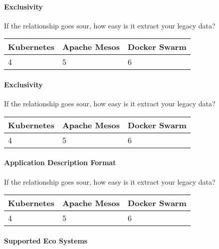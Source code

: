 \paragraph{Exclusivity}

If the relationship goes sour, how easy is it extract your legacy data?

\begin{center}
  \begin{tabular}{ | p{4.2cm} | p{4.2cm} | p{4.2cm} | }
    \hline
    \textbf{Kubernetes}&\textbf{Apache Mesos}&\textbf{Docker Swarm}\\\hline
    4 & 5 & 6 \\
    \hline
  \end{tabular}
\end{center}


\paragraph{Exclusivity}

If the relationship goes sour, how easy is it extract your legacy data?

\begin{center}
  \begin{tabular}{ | p{4.2cm} | p{4.2cm} | p{4.2cm} | }
    \hline
    \textbf{Kubernetes}&\textbf{Apache Mesos}&\textbf{Docker Swarm}\\\hline
    4 & 5 & 6 \\
    \hline
  \end{tabular}
\end{center}

\paragraph{Application Description Format}

If the relationship goes sour, how easy is it extract your legacy data?

\begin{center}
  \begin{tabular}{ | p{4.2cm} | p{4.2cm} | p{4.2cm} | }
    \hline
    \textbf{Kubernetes}&\textbf{Apache Mesos}&\textbf{Docker Swarm}\\\hline
    4 & 5 & 6 \\
    \hline
  \end{tabular}
\end{center}
 
\paragraph{Supported Eco Systems}

